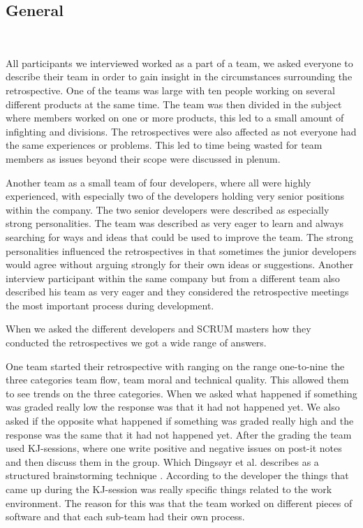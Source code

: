 \subsection{General} %
\label{sub:general}
\

\label{question-1}

\label{question-2}

All participants we interviewed worked as a part of a team, we asked everyone to describe their team in order to gain insight in the circumstances surrounding the retrospective.  One of the teams was large with ten people working on several different products at the same time. The team was then divided in the subject where members worked on one or more products, this led to a small amount of infighting and divisions. The retrospectives were also affected as not everyone had the same experiences or problems. This led to time being wasted for team members as issues beyond their scope were discussed in plenum. 

Another team as a small team of four developers, where all were highly experienced, with especially two of the developers holding very senior positions within the company. The two senior developers were described as especially strong personalities. The team was described as very eager to learn and always searching for ways and ideas that could be used to improve the team. The strong personalities influenced the retrospectives in that sometimes the junior developers would agree without arguing strongly for their own ideas or suggestions. Another interview participant within the same company but from a different team also described his team as very eager and they considered the retrospective meetings the most important process during development. 


\label{question-3}
When we asked the different developers and SCRUM masters how they conducted the retrospectives we got a wide range of answers. 

One team started their retrospective with ranging on the range one-to-nine the three categories team flow, team moral and technical quality. This allowed them to see trends on the three categories. When we asked what happened if something was graded really low the response was that it had not happened yet. We also asked if the opposite what happened if something was graded really high and the response was the same that it had not happened yet. After the grading the team used KJ-sessions, where one write positive and negative issues on post-it notes and then discuss them in the group. Which Dingsøyr et al. describes as a structured brainstorming technique \cite{Dingsoyr2003}. According to the developer the things that came up during the KJ-session was really specific things related to the work environment. The reason for this was that the team worked on different pieces of software and that each sub-team had their own process. 

